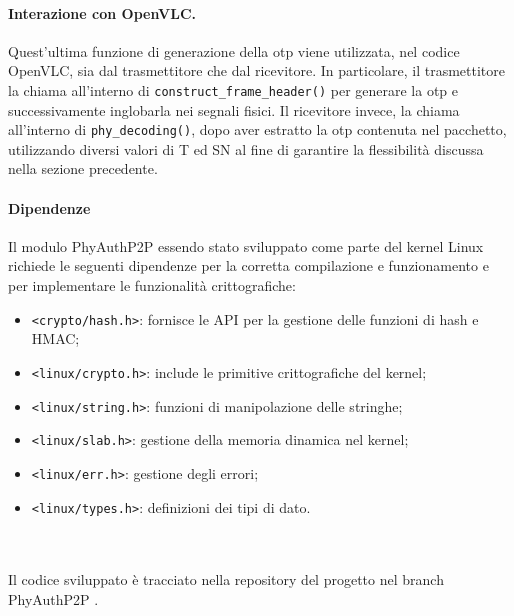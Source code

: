 \paragraph{Interazione con OpenVLC.}
Quest'ultima funzione di generazione della \gls{otp} viene utilizzata, nel codice OpenVLC, sia dal trasmettitore che dal ricevitore.
In particolare, il trasmettitore la chiama all'interno di \texttt{construct\_frame\_header()} per generare la \gls{otp} e successivamente inglobarla nei segnali fisici. Il ricevitore invece, la chiama all'interno di \texttt{phy\_decoding()}, dopo aver estratto la \gls{otp} contenuta nel pacchetto, utilizzando diversi valori di T ed SN al fine di garantire la flessibilità discussa nella sezione precedente.

\paragraph{Dipendenze}
Il modulo PhyAuthP2P essendo stato sviluppato come parte del kernel Linux richiede le seguenti dipendenze per la corretta compilazione e funzionamento e per implementare le funzionalità crittografiche:
\begin{itemize}
    \item \texttt{<crypto/hash.h>}: fornisce le API per la gestione delle funzioni di hash e HMAC;
    \item \texttt{<linux/crypto.h>}: include le primitive crittografiche del kernel;
    \item \texttt{<linux/string.h>}: funzioni di manipolazione delle stringhe;
    \item \texttt{<linux/slab.h>}: gestione della memoria dinamica nel kernel;
    \item \texttt{<linux/err.h>}: gestione degli errori;
    \item \texttt{<linux/types.h>}: definizioni dei tipi di dato.\\\\\\
\end{itemize}

\noindent Il codice sviluppato è tracciato nella repository del progetto nel branch PhyAuthP2P \cite{site:openvlc-pa-github}.
